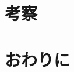 \documentclass[uplatex]{suribt}
\begin{document}
\chapter{考察}
\chapter{おわりに}

\backmatter%



\end{document}
